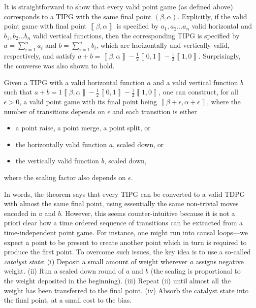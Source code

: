 \documentclass{theoretics}
\newcommand{\atul}[1]{#1} %
\begin{document}
%

It is straightforward to show that every valid point game (as defined above) corresponds to a TIPG with the same final point $(\beta,\alpha)$. %
Explicitly, if the valid point game with final point $\left\llbracket \beta,\alpha\right\rrbracket $
is specified by $a_{1},a_{2}\dots a_{n}$ valid horizontal and $b_{1},b_{2}\dots b_{n}$ valid vertical functions,
then the corresponding TIPG is specified by $a=\sum_{i=1}^{n}a_{i}$
and $b=\sum_{i=1}^{n}b_{i}$, which are horizontally and vertically
valid, respectively, and satisfy $a+b=\left\llbracket \beta,\alpha\right\rrbracket -\frac{1}{2}\left\llbracket 0,1\right\rrbracket -\frac{1}{2}\left\llbracket 1,0\right\rrbracket $. Surprisingly, the converse was also shown to hold.

\begin{theorem}
  Given a TIPG with a valid horizontal function $a$ and a valid vertical
  function $b$ such that $a+b=1\left\llbracket\beta,\alpha\right\rrbracket-\frac{1}{2}\left\llbracket0,1\right\rrbracket-\frac{1}{2}\left\llbracket1,0\right\rrbracket$,
  one can construct, for all $\epsilon>0$, a valid point game with its final
  point being $\left\llbracket\beta+\epsilon,\alpha+\epsilon\right\rrbracket$, where the number of transitions
  depends on $\epsilon$ \atul{
    and each transition is either}
  \begin{itemize}
    \item \atul{
            a point raise, a point merge, a point split, or}
    \item \atul{
            the horizontally valid function $a$, scaled down, or}
    \item \atul{
            the vertically valid function $b$, scaled down,}
  \end{itemize} %
  \atul{
    where the scaling factor also depends on $\epsilon$.}
  \label{thm:TIPG-to-valid-point-games}
\end{theorem}

%

%
%
%
%
%
%
%

In words, the theorem says that every TIPG can be converted to a valid TDPG with almost the same final point\atul{, using essentially the same non-trivial moves encoded in $a$ and $b$}. However, this seems counter-intuitive because it is not a priori clear how a time ordered sequence of transitions can be extracted from a time-independent point game. For instance, one might run into causal loops---we expect a point to be present to create another point which in turn is required to produce the first point. To overcome such issues, the key idea is to use a so-called \emph{catalyst state}: (i) Deposit a small amount of weight wherever $a$ assigns negative weight. (ii) Run a scaled down round of $a$ and $b$ (the scaling is proportional to the weight deposited in the beginning). (iii) Repeat (ii) until almost all the weight has been transferred to the final point. (iv) Absorb the catalyst state \atul{into the final point,} at a small cost to the bias.
\end{document}
